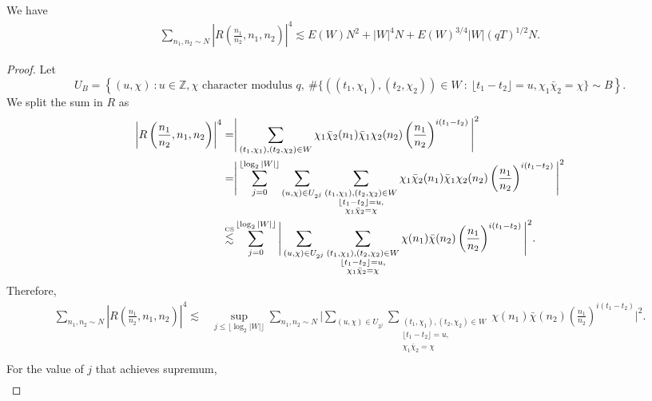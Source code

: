 \begin{lemma}
    We have \begin{align*}
        \sum_{n_1,n_2\sim N}  \left|R\left(\frac{n_1}{n_2} ,n_1,n_2\right) \right|^4 \lesssim E(W)N^2+ |W|^4N +  E(W)^{3/4}|W|(qT)^{1/2}N.
    \end{align*}
\end{lemma}
\begin{proof}
    Let \[
    U_B=\left\{(u,\chi) \ : u\in \mathbb{Z},\chi \textrm{ character modulus $q$}, \ \#\{((t_1,\chi_1),(t_2,\chi_2))\in W \ : \ \lfloor {t_1-t_2}\rfloor = u, \chi_1\bar\chi_2=\chi\} \sim B \right\}.
    \]
    We split the sum in $R$ as \begin{align*}
        \left|R\left(\frac{n_1}{n_2} ,n_1,n_2\right) \right|^4 =&
        \Bigg|
        \sum_{(t_1,\chi_1),(t_2,\chi_2)\in W}
        \chi_1\bar{\chi}_2(n_1)\bar\chi_1{\chi}_2(n_2) \left(\frac{n_1}{n_2}\right)^{i(t_1-t_2)}\Bigg|^2 \\
        =& \Bigg|
        \sum_{j=0}^{ \lfloor \log_2 |W|\rfloor} \sum_{(u,\chi)\in U_{2^j}}\sum_{\substack{(t_1,\chi_1),(t_2,\chi_2)\in W\\ \lfloor t_1-t_2 \rfloor = u,\\ \chi_1\bar\chi_2=\chi}} 
        \chi_1\bar{\chi}_2(n_1)\bar\chi_1{\chi}_2(n_2)  \left(\frac{n_1}{n_2}\right)^{i(t_1-t_2)}\Bigg|^2\\
        \stackon{CS}{\lesssim}& \sum_{j=0}^{ \lfloor \log_2 |W|\rfloor} \Bigg|
         \sum_{(u,\chi)\in U_{2^j}}\sum_{\substack{(t_1,\chi_1),(t_2,\chi_2)\in W\\ \lfloor t_1-t_2 \rfloor = u,\\ \chi_1\bar\chi_2=\chi}} 
         \chi(n_1)\bar\chi(n_2)  \left(\frac{n_1}{n_2}\right)^{i(t_1-t_2)}\Bigg|^2.
    \end{align*}
    Therefore, \begin{align*}
        \sum_{n_1,n_2\sim N}\left|R\left(\frac{n_1}{n_2},n_1,n_2\right) \right|^4 \lesssim & 
        \sup_{j\leq \lfloor \log_2 |W|\rfloor} \sum_{n_1,n_2\sim N} \Bigg|
        \sum_{(u,\chi)\in U_{2^j}}\sum_{\substack{(t_1,\chi_1),(t_2,\chi_2)\in W\\ \lfloor t_1-t_2 \rfloor = u,\\ \chi_1\bar\chi_2=\chi}} 
       \chi(n_1)\bar{\chi}(n_2) \left(\frac{n_1}{n_2}\right)^{i(t_1-t_2)}\Bigg|^2.\\
    \end{align*}
For the value of $j$ that achieves supremum, \begin{align*}

\end{align*}
\end{proof}
